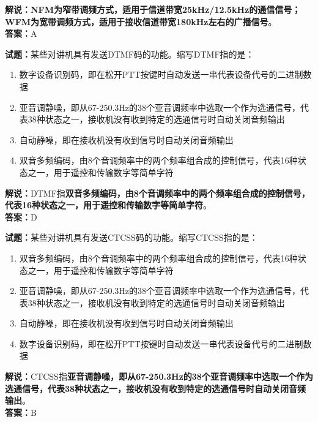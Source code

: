 \documentclass{ctexbook}
\begin{document}
\noindent\textbf{解说：NFM为窄带调频方式，适用于信道带宽25kHz/12.5kHz的通信信号；WFM为宽带调频方式，适用于接收信道带宽180kHz左右的广播信号}。\\\noindent\textbf{答案：}A


\bigskip


\noindent\textbf{试题：}某些对讲机具有发送DTMF码的功能。缩写DTMF指的是：

\begin{enumerate}[leftmargin=3em]
	\item 数字设备识别码，即在松开PTT按键时自动发送一串代表设备代号的二进制数据
	\item 亚音调静噪，即从67-250.3Hz的38个亚音调频率中选取一个作为选通信号，代表38种状态之一，接收机没有收到特定的选通信号时自动关闭音频输出	
	\item 自动静噪，即在接收机没有收到信号时自动关闭音频输出
	\item 双音多频编码，由8个音调频率中的两个频率组合成的控制信号，代表16种状态之一，用于遥控和传输数字等简单字符
\end{enumerate}

\noindent\textbf{解说：}DTMF指\textbf{双音多频编码，由8个音调频率中的两个频率组合成的控制信号，代表16种状态之一，用于遥控和传输数字等简单字符}。\\\noindent\textbf{答案：}D


\bigskip


\noindent\textbf{试题：}某些对讲机具有发送CTCSS码的功能。缩写CTCSS指的是：

\begin{enumerate}[leftmargin=3em]
	\item 双音多频编码，由8个音调频率中的两个频率组合成的控制信号，代表16种状态之一，用于遥控和传输数字等简单字符
	\item 亚音调静噪，即从67-250.3Hz的38个亚音调频率中选取一个作为选通信号，代表38种状态之一，接收机没有收到特定的选通信号时自动关闭音频输出
	\item 自动静噪，即在接收机没有收到信号时自动关闭音频输出
	\item 数字设备识别码，即在松开PTT按键时自动发送一串代表设备代号的二进制数据
\end{enumerate}

\noindent\textbf{解说：}CTCSS指\textbf{亚音调静噪，即从67-250.3Hz的38个亚音调频率中选取一个作为选通信号，代表38种状态之一，接收机没有收到特定的选通信号时自动关闭音频输出}。\\\noindent\textbf{答案：}B


\bigskip
\end{document}
